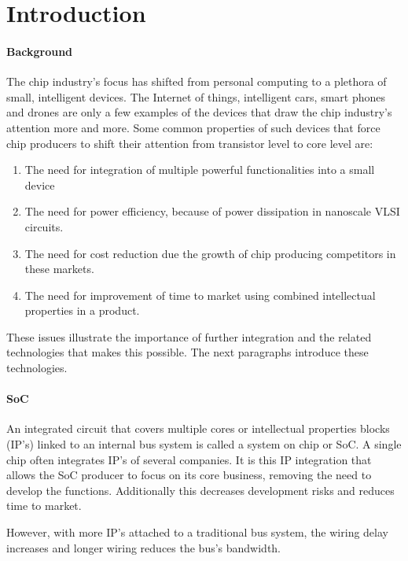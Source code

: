 \section{Introduction}

\paragraph{Background} \cite{SoC-market}

The chip industry's focus has shifted from personal computing to a plethora of
small, intelligent devices. The Internet of things, intelligent cars, smart
phones and drones are only a few examples of the devices that draw the chip industry's
attention more and more. Some common properties of such devices that force chip
producers to shift their attention from transistor level to core level are:

\begin{enumerate}
\item The need for integration of multiple powerful functionalities into a small device
\item The need for power efficiency, because of power dissipation in nanoscale VLSI circuits. 
\item The need for cost reduction due the growth of chip producing competitors in these markets.
\item The need for improvement of time to market using combined intellectual properties in a product.
\end{enumerate}

These issues illustrate the importance of further integration and the related
technologies that makes this possible. The next paragraphs introduce these
technologies.

\paragraph{SoC}

An integrated circuit that covers multiple cores or intellectual properties
blocks (IP's) linked to an internal bus system is called a system on chip or
SoC. A single chip often integrates IP's of several companies. It is this IP
integration that allows the SoC producer to focus on its core business, removing
the need to develop the functions. Additionally this decreases development risks
and reduces time to market.

However, with more IP's attached to a traditional bus system, the wiring delay increases 
and longer wiring reduces the bus's bandwidth.\cite{SoC}

